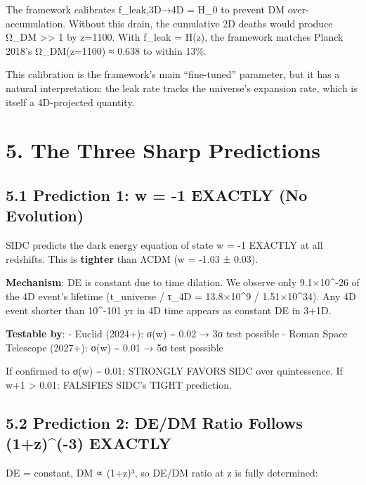 \documentclass[11pt,a4paper]{article}
\begin{document}
The framework calibrates f\_leak,3D→4D = H\_0 to prevent DM
over-accumulation. Without this drain, the cumulative 2D deaths would
produce Ω\_DM \textgreater\textgreater{} 1 by z=1100. With f\_leak =
H(z), the framework matches Planck 2018's Ω\_DM(z=1100) ≈ 0.638 to
within 13\%.

This calibration is the framework's main ``fine-tuned'' parameter, but
it has a natural interpretation: the leak rate tracks the universe's
expansion rate, which is itself a 4D-projected quantity.

\hypertarget{the-three-sharp-predictions}{%
\section{5. The Three Sharp
Predictions}\label{the-three-sharp-predictions}}

\hypertarget{prediction-1-w--1-exactly-no-evolution}{%
\subsection{5.1 Prediction 1: w = -1 EXACTLY (No
Evolution)}\label{prediction-1-w--1-exactly-no-evolution}}

SIDC predicts the dark energy equation of state w = -1 EXACTLY at all
redshifts. This is \textbf{tighter} than ΛCDM (w = -1.03 ± 0.03).

\textbf{Mechanism}: DE is constant due to time dilation. We observe only
9.1×10\^{}-26 of the 4D event's lifetime (t\_universe / τ\_4D =
13.8×10\^{}9 / 1.51×10\^{}34). Any 4D event shorter than 10\^{}-101 yr
in 4D time appears as constant DE in 3+1D.

\textbf{Testable by}: - Euclid (2024+): σ(w) \textasciitilde{} 0.02 → 3σ
test possible - Roman Space Telescope (2027+): σ(w) \textasciitilde{}
0.01 → 5σ test possible

If confirmed to σ(w) \textasciitilde{} 0.01: STRONGLY FAVORS SIDC over
quintessence. If \textbar w+1\textbar{} \textgreater{} 0.01: FALSIFIES
SIDC's TIGHT prediction.

\hypertarget{prediction-2-dedm-ratio-follows-1z-3-exactly}{%
\subsection{5.2 Prediction 2: DE/DM Ratio Follows (1+z)\^{}(-3)
EXACTLY}\label{prediction-2-dedm-ratio-follows-1z-3-exactly}}

DE = constant, DM ∝ (1+z)³, so DE/DM ratio at z is fully determined:
\end{document}
